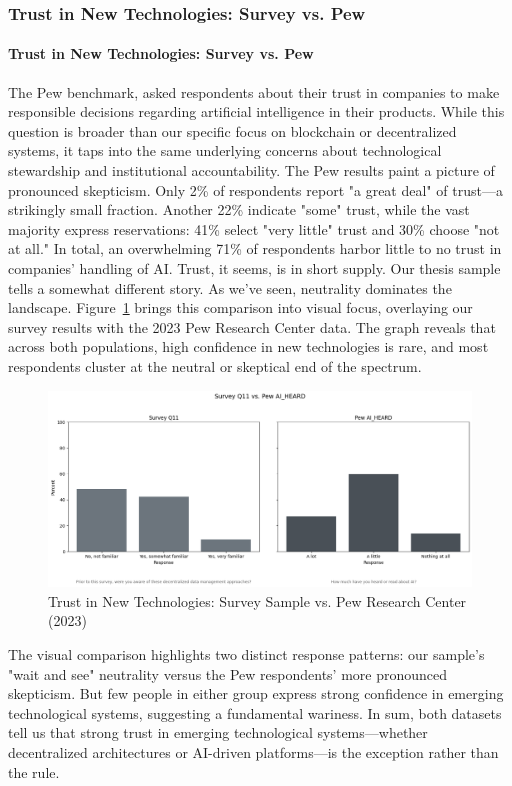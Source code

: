 	\subsubsection{Trust in New Technologies: Survey vs. Pew}

	\paragraph{Trust in New Technologies: Survey vs. Pew}
	The Pew benchmark, asked respondents about their trust in companies to make responsible decisions regarding artificial intelligence in their products. While this question is broader than our specific focus on blockchain or decentralized systems, it taps into the same underlying concerns about technological stewardship and institutional accountability. The Pew results paint a picture of pronounced skepticism. Only 2\% of respondents report "a great deal" of trust—a strikingly small fraction. Another 22\% indicate "some" trust, while the vast majority express reservations: 41\% select "very little" trust and 30\% choose "not at all." In total, an overwhelming 71\% of respondents harbor little to no trust in companies' handling of AI. Trust, it seems, is in short supply.
	Our thesis sample tells a somewhat different story. As we've seen, neutrality dominates the landscape.
	Figure~\ref{fig:trust_newtech_pew} brings this comparison into visual focus, overlaying our survey results with the 2023 Pew Research Center data. The graph reveals that across both populations, high confidence in new technologies is rare, and most respondents cluster at the neutral or skeptical end of the spectrum.
	\begin{figure}[ht]\centering
		\includegraphics[width=0.7\linewidth]{figures/img/pew_comparison_plots/compare_11_vs_AI_HEARD.png}
		\caption{Trust in New Technologies: Survey Sample vs. Pew Research Center (2023)}
		\label{fig:trust_newtech_pew}
	\end{figure}
	The visual comparison highlights two distinct response patterns: our sample's "wait and see" neutrality versus the Pew respondents' more pronounced skepticism. But few people in either group express strong confidence in emerging technological systems, suggesting a fundamental wariness. 			
	In sum, both datasets tell us that strong trust in emerging technological systems—whether decentralized architectures or AI-driven platforms—is the exception rather than the rule.
